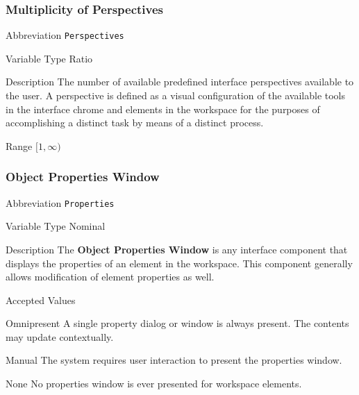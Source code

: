\subsubsection{Multiplicity of Perspectives}
\label{subsec:perspectives}

\begin{AlignedDesc}
  \item[Abbreviation] \texttt{Perspectives}

  \item[Variable Type] Ratio

  \item[Description] The number of available predefined interface
  perspectives available to the user. A perspective is defined as a visual
  configuration of the available tools in the interface chrome and elements
  in the workspace for the purposes of accomplishing a distinct task by
  means of a distinct process.

  \item[Range] $[1 , \infty)$

\end{AlignedDesc}

\subsubsection{Object Properties Window}
\label{subsec:properties}

\begin{AlignedDesc}
  \item[Abbreviation] \texttt{Properties}

  \item[Variable Type] Nominal

  \item[Description] The \textbf{Object Properties Window} is any interface
  component that displays the properties of an element in the workspace.
  This component generally allows modification of element properties as
  well.

  \item[Accepted Values]

  \begin{AlignedDesc}
    \item[Omnipresent] A single property dialog or window is always
    present. The contents may update contextually.
    \item[Manual] The system requires user interaction to present the
    properties window.
    \item[None] No properties window is ever presented for workspace
    elements.
  \end{AlignedDesc}

\end{AlignedDesc}

